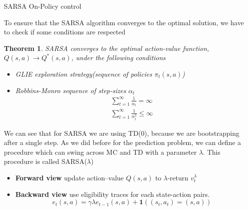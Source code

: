 \documentclass[main.tex]{subfiles}
\newtheorem{theorem}{Theorem}[section]
\begin{document}
\begin{algorithm}[H]
    \SetAlgoLined


    \caption{SARSA On-Policy control}
\end{algorithm}
\par
\noindent
To ensure that the SARSA algorithm converges to the optimal solution, we have to check if some conditions are respected
\newpage
\begin{theorem}
    SARSA converges to the optimal action-value function, $Q(s,a) \rightarrow Q^*(s,a)$, under the following conditions
    \begin{itemize}
        \item GLIE exploration strategy(sequence of policies $\pi_t(s,a)$)
        \item Robbins-Monro sequence of step-sizes $\alpha_t$
              \begin{gather*}
                  \sum_{t=1}^{\infty} \frac{1}{\alpha_t} = \infty \\
                  \sum_{t=1}^{\infty} \frac{1}{\alpha_t^2} \leq \infty
              \end{gather*}
    \end{itemize}
\end{theorem}
We can see that for SARSA we are using TD(0), because we are bootstrapping after a single step. As we did before for the prediction problem, we can define a procedure which can swing across MC and TD with a parameter $\lambda$. This procedure is called SARSA($\lambda$)
\begin{itemize}
    \item \textbf{Forward view} update action–value $Q(s,a)$ to $\lambda$-return $v_t^{\lambda}$
    \item \textbf{Backward view} use eligibility traces for each state-action pairs.
          \begin{equation*}
              e_t(s,a) = \gamma \lambda e_{t-1}(s,a) + \mathbf{1}((s_t,a_t) = (s,a))
          \end{equation*}
\end{itemize}
\end{document}
